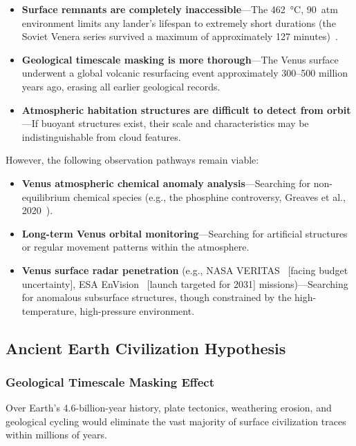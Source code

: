 \documentclass[aps,prd,twocolumn,superscriptaddress,nofootinbib]{revtex4-2}
\begin{document}
\begin{itemize}
  \item \textbf{Surface remnants are completely inaccessible}---The \SI{462}{\degreeCelsius}, \SI{90}{atm} environment limits any lander's lifespan to extremely short durations (the Soviet Venera series survived a maximum of approximately 127 minutes)~\cite{NASA_Venera13}.
  \item \textbf{Geological timescale masking is more thorough}---The Venus surface underwent a global volcanic resurfacing event approximately 300--500 million years ago, erasing all earlier geological records.
  \item \textbf{Atmospheric habitation structures are difficult to detect from orbit}---If buoyant structures exist, their scale and characteristics may be indistinguishable from cloud features.
\end{itemize}

However, the following observation pathways remain viable:

\begin{itemize}
  \item \textbf{Venus atmospheric chemical anomaly analysis}---Searching for non-equilibrium chemical species (e.g., the phosphine controversy, Greaves et al., 2020~\cite{Greaves2021}).
  \item \textbf{Long-term Venus orbital monitoring}---Searching for artificial structures or regular movement patterns within the atmosphere.
  \item \textbf{Venus surface radar penetration} (e.g., NASA VERITAS~\cite{NASA_VERITAS} [facing budget uncertainty], ESA EnVision~\cite{ESA_EnVision} [launch targeted for 2031] missions)---Searching for anomalous subsurface structures, though constrained by the high-temperature, high-pressure environment.
\end{itemize}

\subsection{Ancient Earth Civilization Hypothesis}\label{sec:earth-civ}

\subsubsection{Geological Timescale Masking Effect}\label{sec:geo-masking}

Over Earth's 4.6-billion-year history, plate tectonics, weathering erosion, and geological cycling would eliminate the vast majority of surface civilization traces within millions of years.
\end{document}
